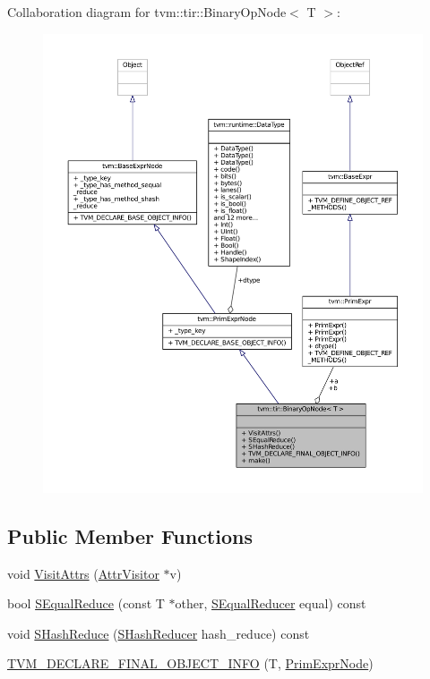Collaboration diagram for tvm\+:\+:tir\+:\+:Binary\+Op\+Node$<$ T $>$\+:
\nopagebreak
\begin{figure}[H]
\begin{center}
\leavevmode
\includegraphics[width=350pt]{classtvm_1_1tir_1_1BinaryOpNode__coll__graph}
\end{center}
\end{figure}
\subsection*{Public Member Functions}
\begin{DoxyCompactItemize}
\item 
void \hyperlink{classtvm_1_1tir_1_1BinaryOpNode_a75e2d8fdc2a5793f34ecb771a6938cc6}{Visit\+Attrs} (\hyperlink{classtvm_1_1AttrVisitor}{Attr\+Visitor} $\ast$v)
\item 
bool \hyperlink{classtvm_1_1tir_1_1BinaryOpNode_a743b7846b1376cb2d8e4b821d9cb9eaa}{S\+Equal\+Reduce} (const T $\ast$other, \hyperlink{classtvm_1_1SEqualReducer}{S\+Equal\+Reducer} equal) const 
\item 
void \hyperlink{classtvm_1_1tir_1_1BinaryOpNode_a2fd1d01ff422a1765b27f1da1b7af4ce}{S\+Hash\+Reduce} (\hyperlink{classtvm_1_1SHashReducer}{S\+Hash\+Reducer} hash\+\_\+reduce) const 
\item 
\hyperlink{classtvm_1_1tir_1_1BinaryOpNode_a5c562cd4eac4b86d0b06f29eb92ef70d}{T\+V\+M\+\_\+\+D\+E\+C\+L\+A\+R\+E\+\_\+\+F\+I\+N\+A\+L\+\_\+\+O\+B\+J\+E\+C\+T\+\_\+\+I\+N\+FO} (T, \hyperlink{classtvm_1_1PrimExprNode}{Prim\+Expr\+Node})
\end{DoxyCompactItemize}
